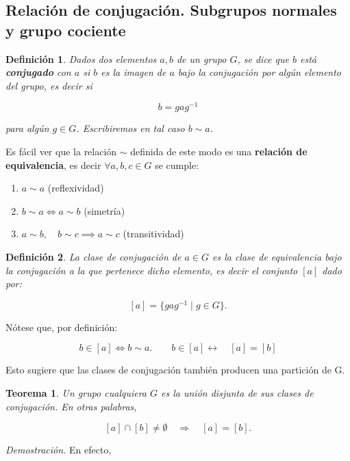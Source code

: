 \documentclass{report}
\newtheorem{theorem}{Teorema}
\newtheorem{definition}{Definición}
\begin{document}
\newpage
\subsection{Relación de conjugación. Subgrupos normales y grupo cociente}

\begin{definition}
Dados dos elementos \( a, b \) de un grupo \( G \), se dice que \( b \) está \textbf{conjugado} con \( a \) si \( b \) es la imagen de \( a \) bajo la conjugación por algún elemento del grupo, es decir si

\[
b = g a g^{-1}
\]

para algún \( g \in G \). Escribiremos en tal caso \( b \sim a \).

\end{definition}



 Es fácil ver que la relación \( \sim \) definida de este modo es una \textbf{relación de equivalencia}, es decir \(\forall a, b, c \in G\) se cumple:

\begin{enumerate}
    \item \( a \sim a \) \quad (reflexividad)
    \item \( b \sim a \iff a \sim b \) \quad (simetría)
    \item \( a \sim b, \quad b \sim c \implies a \sim c \) \quad (transitividad)
\end{enumerate}

\begin{definition}
La clase de conjugación de \( a \in G \) es la clase de equivalencia bajo la conjugación a la que pertenece dicho elemento, es decir el conjunto \([a]\) dado por:

\[
[a] = \{ g a g^{-1} \mid g \in G \}.
\]
\end{definition}
Nótese que, por definición:

\[
b \in [a] \iff b \sim a.
\qquad
b \in [a] \leftrightarrow \quad [a]=[b]\]


Esto sugiere que las clases de conjugación también producen una partición de G.


\begin{theorem}


Un grupo cualquiera \( G \) es la unión disjunta de sus clases de conjugación. En otras palabras,

\[[a] \cap [b] \neq \emptyset \quad \Longrightarrow \quad [a] = [b].\]

\end{theorem}
\textit{Demostración.} En efecto,
\end{document}
